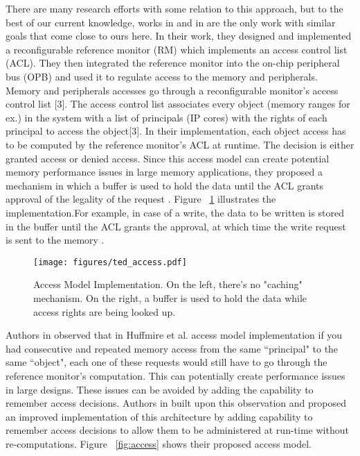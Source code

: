 \documentclass[sigconf]{acmart}
\theoremstyle{plain}
\theoremstyle{remark}
\begin{document}
There are many research efforts with some relation to this approach, but to the best of our current knowledge, works in \cite{HuffEmbedded} and in \cite{Huffmire} are the only work with similar goals that come close to ours here. In their work, they designed and implemented a reconfigurable reference monitor (RM) which implements an access control list (ACL). They then integrated the reference monitor into the on-chip peripheral bus (OPB) and used it to regulate access to the memory and peripherals. Memory and peripherals accesses go through a reconfigurable monitor's access control list [3]. The access control list associates every object (memory ranges for ex.) in the system with a list of principals (IP cores) with the rights of each principal to access the object[3]. In their implementation, each object access has to be computed by the reference monitor's ACL at runtime. The decision is either granted access or denied access. Since this access model can create potential memory performance issues in large memory applications, they proposed a mechanism in which a buffer is used to hold the data until the ACL grants approval of the legality of the request \cite{SPHuffmire}. Figure ~\ref{fig:ted} illustrates the implementation.For example, in case of a write, the data to be written is stored in the buffer until the ACL grants the approval, at which time the write request is sent to the memory \cite{SPHuffmire}.


\begin{figure}[hbt]
\centering
\texttt{[image: figures/ted\_access.pdf]}
\caption{Access Model Implementation. On the left, there's no "caching" mechanism. On the right, a buffer is used to hold the data while access rights are being looked up.} %
\label{fig:ted}
\end{figure}



Authors in \cite{FestusFCCM} observed that in Huffmire et al. access model implementation if you had consecutive and repeated memory access from the same ``principal" to the same ``object", each one of these requests would still have to go through the reference monitor's computation. This can potentially create performance issues in large designs. These issues can be avoided by adding the capability to remember access decisions. Authors in \cite{FestusFCCM} built upon this observation and proposed an improved implementation of this architecture by adding capability to remember access decisions to allow them to be administered at run-time without re-computations. Figure ~\ref{fig:access} shows their proposed access model.
\end{document}
